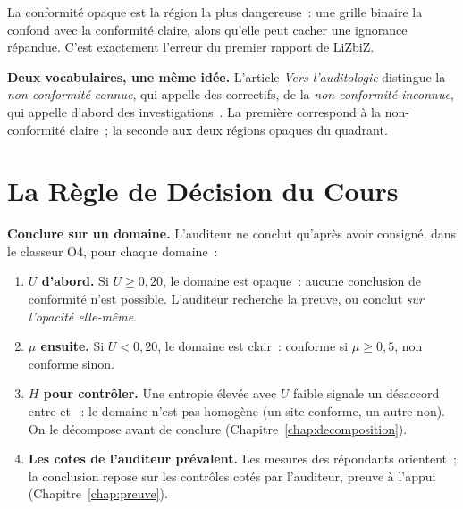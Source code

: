 La conformité opaque est la région la plus dangereuse~: une grille binaire
la confond avec la conformité claire, alors qu'elle peut cacher une
ignorance répandue. C'est exactement l'erreur du premier rapport de LiZbiZ.

\begin{boxinfo}
\textbf{Deux vocabulaires, une même idée.} L'article \emph{Vers
l'auditologie} distingue la \emph{non-conformité connue}, qui appelle des
correctifs, de la \emph{non-conformité inconnue}, qui appelle d'abord des
investigations~\cite{minka2026auditologie}. La première correspond à la
non-conformité claire~; la seconde aux deux régions opaques du quadrant.
\end{boxinfo}

\section{La Règle de Décision du Cours}
\label{sec:c09-regle}

\begin{boxprocedure}
\textbf{Conclure sur un domaine.} L'auditeur ne conclut qu'après avoir
consigné, dans le classeur O4, pour chaque domaine~:
\begin{enumerate}
    \item \textbf{$U$ d'abord.} Si $U \geq 0{,}20$, le domaine est opaque~:
          aucune conclusion de conformité n'est possible. L'auditeur
          recherche la preuve, ou conclut \emph{sur l'opacité elle-même}.
    \item \textbf{$\mu$ ensuite.} Si $U < 0{,}20$, le domaine est clair~:
          conforme si $\mu \geq 0{,}5$, non conforme sinon.
    \item \textbf{$H$ pour contrôler.} Une entropie élevée avec $U$ faible
          signale un désaccord entre \OUI{} et \NON{}~: le domaine n'est pas
          homogène (un site conforme, un autre non). On le décompose avant de
          conclure (Chapitre~\ref{chap:decomposition}).
    \item \textbf{Les cotes de l'auditeur prévalent.} Les mesures des
          répondants orientent~; la conclusion repose sur les contrôles cotés
          par l'auditeur, preuve à l'appui (Chapitre~\ref{chap:preuve}).
\end{enumerate}
\end{boxprocedure}


